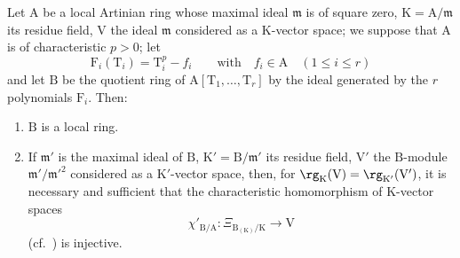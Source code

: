 \begin{proposition}[22.4.7]
\label{0.22.4.7}
Let $\mathrm{A}$ be a local Artinian ring whose maximal ideal $\mathfrak{m}$ is of square zero, $\mathrm{K}=\mathrm{A}/\mathfrak{m}$ its residue field, $\mathrm{V}$ the ideal $\mathfrak{m}$ considered as a $\mathrm{K}$-vector space; we suppose that $\mathrm{A}$ is of characteristic $p>0$; let
\[
\label{0.22.4.7.1}
  \mathrm{F}_i(\mathrm{T}_i)=\mathrm{T}_i^p-f_i\qquad\text{with}\quad f_i\in\mathrm{A}\quad(1\leq i\leq r)
  \tag{22.4.7.1}
\]
and let $\mathrm{B}$ be the quotient ring of $\mathrm{A}[\mathrm{T}_1,\ldots,\mathrm{T}_r]$ by the ideal generated by the $r$ polynomials $\mathrm{F}_i$.
Then:
\begin{enumerate}
  \item[\rm{(i)}] $\mathrm{B}$ is a local ring.
  \item[\rm{(ii)}] If $\mathfrak{m}'$ is the maximal ideal of $\mathrm{B}$, $\mathrm{K}'=\mathrm{B}/\mathfrak{m}'$ its residue field, $\mathrm{V}'$ the $\mathrm{B}$-module $\mathfrak{m}'/\mathfrak{m}'^2$ considered as a $\mathrm{K}'$-vector space, then, for $\rg_\mathrm{K}(\mathrm{V})=\rg_{\mathrm{K}'}(\mathrm{V}')$, it is necessary and sufficient that the characteristic homomorphism of $\mathrm{K}$-vector spaces
\[
\label{0.22.4.7.2}
  \chi'_{\mathrm{B}/\mathrm{A}}:\Xi_{\mathrm{B}_{(\mathrm{K})}/\mathrm{K}}\to\mathrm{V}
  \tag{22.4.7.2}
\]
  (cf.~) is injective.
\end{enumerate}
\end{proposition}

